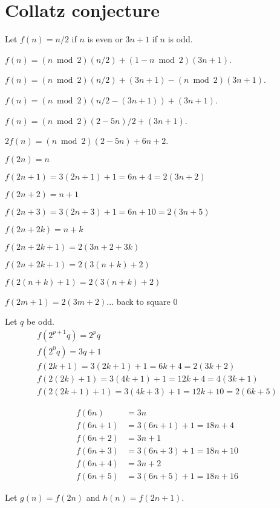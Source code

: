 \chapter{Collatz conjecture}

Let \(f(n) = n/2\) if \(n\) is even or \(3n+1\) if \(n\) is odd.

\(f(n) = (n \bmod 2) (n/2) + (1 - n \bmod 2) (3n + 1)\).

\(f(n) = (n \bmod 2) (n/2) + (3n + 1) - (n \bmod 2) (3n + 1)\).

\(f(n) = (n \bmod 2) (n/2 - (3n + 1)) + (3n + 1)\).

\(f(n) = (n \bmod 2) (2 - 5n)/2 + (3n + 1)\).

\(2 f(n) = (n \bmod 2) (2 - 5n) + 6n + 2\).

\(f(2n) = n\)

\(f(2n+1) = 3(2n+1)+1 = 6n+4 = 2(3n+2)\)

\(f(2n+2) = n+1\)

\(f(2n+3) = 3(2n+3)+1 = 6n+10 = 2(3n+5)\)

\(f(2n+2k) = n+k\)

\(f(2n+2k+1) = 2(3n+2+3k)\)

\(f(2n+2k+1) = 2(3(n+k)+2)\)

\(f(2(n+k)+1) = 2(3(n+k)+2)\)

\(f(2m+1) = 2(3m+2)\)... back to square 0

Let \(q\) be odd.
\begin{align*}
    f(2^{p+1} q) = 2^p q
    \\
    f(2^0 q) = 3q + 1
    \\
    f(2k+1) = 3(2k+1) + 1 = 6k+4 = 2(3k+2)
    \\
    f(2(2k)+1) = 3(4k+1) + 1 = 12k+4 = 4(3k+1)
    \\
    f(2(2k+1)+1) = 3(4k+3) + 1 = 12k+10 = 2(6k+5)
\end{align*}

\begin{align*}
    f(6n) &= 3n
    \\
    f(6n+1) &= 3(6n+1)+1 = 18n+4
    \\
    f(6n+2) &= 3n+1
    \\
    f(6n+3) &= 3(6n+3) + 1 = 18n+10
    \\
    f(6n+4) &= 3n+2
    \\
    f(6n+5) &= 3(6n+5) + 1 = 18n+16
\end{align*}

Let \(g(n) = f(2n)\) and \(h(n) = f(2n+1)\).

